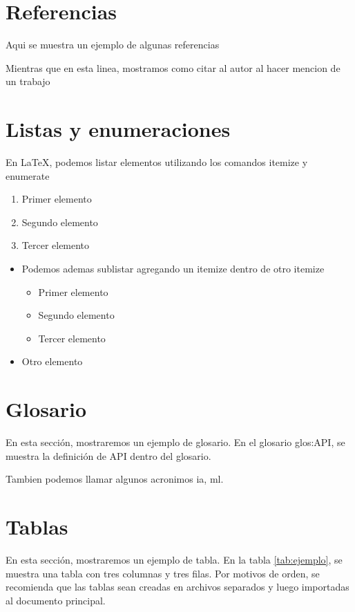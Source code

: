 \section{Referencias}
Aqui se muestra un ejemplo de algunas referencias
\cite{godoyNamedEntityRecognition2023, torresPredictingCardiovascularRehabilitation2023}

Mientras que en esta linea, mostramos como citar al autor al hacer mencion de un trabajo \citeauthor{melladoDeepLearningClassifier2023}

\section{Listas y enumeraciones}
En \LaTeX, podemos listar elementos utilizando los comandos itemize y enumerate

\begin{enumerate}
    \item Primer elemento
    \item Segundo elemento
    \item Tercer elemento
\end{enumerate}

\begin{itemize}
    \item Podemos ademas sublistar agregando un itemize dentro de otro itemize
    \begin{itemize}
        \item Primer elemento
        \item Segundo elemento
        \item Tercer elemento
    \end{itemize}
    \item Otro elemento
\end{itemize}

\section{Glosario}
En esta sección, mostraremos un ejemplo de glosario. En el glosario \gls{glos:API}, se muestra la definición de API dentro del glosario.

Tambien podemos llamar algunos acronimos \gls{ia}, \gls{ml}.




\section{Tablas}
En esta sección, mostraremos un ejemplo de tabla. En la tabla \ref{tab:ejemplo}, se muestra una tabla con tres columnas y tres filas. Por motivos de orden, se recomienda que las tablas sean creadas en archivos separados y luego importadas al documento principal.

